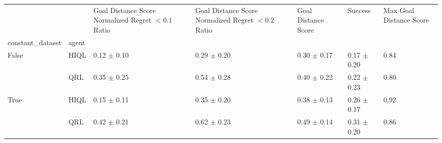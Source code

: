 \begin{tabular}{lllllll}
\toprule
 &  & Goal Distance Score Normalized Regret $< 0.1$ Ratio & Goal Distance Score Normalized Regret $< 0.2$ Ratio & Goal Distance Score & Success & Max Goal Distance Score \\
constant_dataset & agent &  &  &  &  &  \\
\midrule
\multirow[t]{2}{*}{False} & HIQL & 0.12 $\pm$ 0.10 & 0.29 $\pm$ 0.20 & 0.30 $\pm$ 0.17 & 0.17 $\pm$ 0.20 & 0.84 \\
 & QRL & 0.35 $\pm$ 0.25 & 0.54 $\pm$ 0.28 & 0.40 $\pm$ 0.22 & 0.22 $\pm$ 0.23 & 0.80 \\
\cline{1-7}
\multirow[t]{2}{*}{True} & HIQL & 0.15 $\pm$ 0.11 & 0.35 $\pm$ 0.20 & 0.38 $\pm$ 0.13 & 0.26 $\pm$ 0.17 & 0.92 \\
 & QRL & 0.42 $\pm$ 0.21 & 0.62 $\pm$ 0.23 & 0.49 $\pm$ 0.14 & 0.31 $\pm$ 0.20 & 0.86 \\
\cline{1-7}
\bottomrule
\end{tabular}
